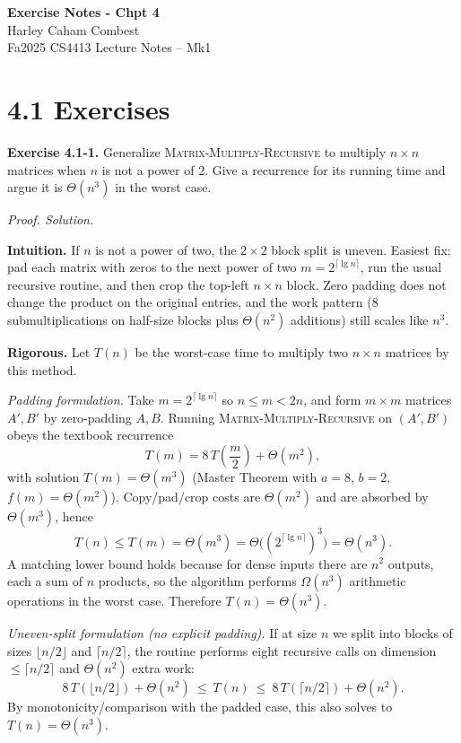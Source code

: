 \documentclass[12pt]{article}
\theoremstyle{definition}
\begin{document}
\begin{center}
\Large\textbf{Exercise Notes - Chpt 4} \\
\large Harley Caham Combest \\
\large Fa2025 CS4413 Lecture Notes – Mk1
\end{center}


\newpage
\dotfill
\section*{4.1 Exercises}
\dotfill
\newpage

\noindent\textbf{Exercise 4.1-1.}
Generalize \textsc{Matrix-Multiply-Recursive} to multiply $n\times n$ matrices when $n$ is not a power of $2$.
Give a recurrence for its running time and argue it is $\Theta(n^3)$ in the worst case.

\medskip
\noindent\textit{Proof. Solution.}

\noindent\textbf{Intuition.}
If $n$ is not a power of two, the $2\times2$ block split is uneven. Easiest fix:
pad each matrix with zeros to the next power of two $m=2^{\lceil \lg n\rceil}$, run the usual recursive routine, and then crop the top-left $n\times n$ block.
Zero padding does not change the product on the original entries, and the work pattern
(8 submultiplications on half-size blocks plus $\Theta(n^2)$ additions)
still scales like $n^3$.

\noindent\textbf{Rigorous.}
Let $T(n)$ be the worst-case time to multiply two $n\times n$ matrices by this method.

\emph{Padding formulation.} Take $m=2^{\lceil \lg n\rceil}$ so $n\le m<2n$, and form
$m\times m$ matrices $A',B'$ by zero-padding $A,B$.
Running \textsc{Matrix-Multiply-Recursive} on $(A',B')$ obeys the textbook recurrence
\[
T(m)=8\,T\!\left(\frac{m}{2}\right)+\Theta(m^2),
\]
with solution $T(m)=\Theta(m^3)$ (Master Theorem with $a=8$, $b=2$, $f(m)=\Theta(m^2)$).
Copy/pad/crop costs are $\Theta(m^2)$ and are absorbed by $\Theta(m^3)$, hence
\[
T(n)\le T(m)=\Theta(m^3)=\Theta\!\big((2^{\lceil \lg n\rceil})^3\big)=\Theta(n^3).
\]
A matching lower bound holds because for dense inputs there are $n^2$ outputs, each a sum of $n$ products,
so the algorithm performs $\Omega(n^3)$ arithmetic operations in the worst case.
Therefore $T(n)=\Theta(n^3)$.

\emph{Uneven-split formulation (no explicit padding).} If at size $n$ we split into blocks of sizes
$\lfloor n/2\rfloor$ and $\lceil n/2\rceil$, the routine performs eight recursive calls on dimension
$\le \lceil n/2\rceil$ and $\Theta(n^2)$ extra work:
\[
8\,T(\lfloor n/2\rfloor)+\Theta(n^2)\ \le\ T(n)\ \le\ 8\,T(\lceil n/2\rceil)+\Theta(n^2).
\]
By monotonicity/comparison with the padded case, this also solves to $T(n)=\Theta(n^3)$.
\end{document}
